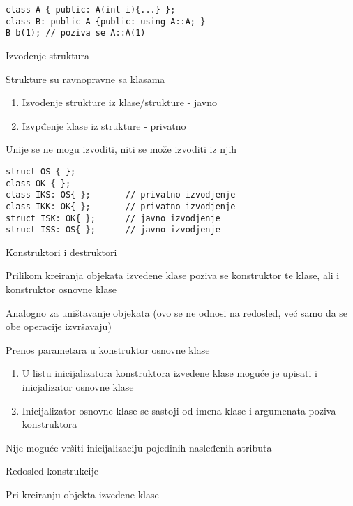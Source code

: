 \documentclass{article}
\newenvironment{xitemize}{%
    
    \itemize
    \larger
}{%
    \enditemize
}
\let\olditemize\itemize
\let\endolditemize\enditemize
\renewenvironment{itemize}{%
    \smaller
    \olditemize
}{%
    \endolditemize
}
\begin{document}
\begin{xitemize}
\begin{itemize}
\begin{lstlisting}
class A { public: A(int i){...} };
class B: public A {public: using A::A; }
B b(1); // poziva se A::A(1)    
\end{lstlisting}
\end{itemize}
\item Izvođenje struktura
\begin{itemize}
    \item Strukture su ravnopravne sa klasama
    \begin{enumerate}
        \item Izvođenje strukture iz klase/strukture - javno
        \item Izvpđenje klase iz strukture - privatno
    \end{enumerate}
    \item Unije se ne mogu izvoditi, niti se može izvoditi iz njih
    \begin{lstlisting}
struct OS { };
class OK { };
class IKS: OS{ };       // privatno izvodjenje
class IKK: OK{ };       // privatno izvodjenje
struct ISK: OK{ };      // javno izvodjenje
struct ISS: OS{ };      // javno izvodjenje
    \end{lstlisting}
\end{itemize}
\item Konstruktori i destruktori
\begin{itemize}
    \item Prilikom kreiranja objekata izvedene klase poziva se konstruktor te klase, ali i konstruktor osnovne klase
    \item Analogno za uništavanje objekata (ovo se ne odnosi na redosled, već samo da se obe operacije izvršavaju)
    \item Prenos parametara u konstruktor osnovne klase
    \begin{enumerate}
        \item U listu inicijalizatora konstruktora izvedene klase moguće je upisati i inicjalizator osnovne klase
        \item Inicijalizator osnovne klase se sastoji od imena klase i argumenata poziva konstruktora
    \end{enumerate}
    \item Nije moguće vršiti inicijalizaciju pojedinih nasleđenih atributa
\end{itemize}
\item Redosled konstrukcije
\begin{itemize}
    \item Pri kreiranju objekta izvedene klase 

\end{itemize}
\end{xitemize}
\end{document}
